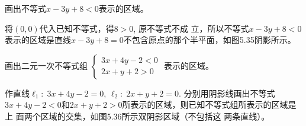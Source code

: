 \begin{example}
    画出不等式$x-3y+8<0$表示的区域。
\end{example}

\begin{solution}
将$(0,0)$代入已知不等式，得$8>0$, 原不等式不成
立，所以不等式$x-3y+8<0$表示的区域是直线$x-3y+8=
0$不包含原点的那个半平面，如图5.35阴影所示。
\end{solution}

\begin{example}
    画出二元一次不等式组
$\begin{cases}
      3x+4y-2<0\\
    2x+y+2>0  
\end{cases}$
    表示的区域。 
\end{example}


\begin{solution}
    作直线$\ell_1:\; 3x+4y-2=0$, $\ell_2:\; 2x+y+2=
0$. 分别用阴影线画出不等式$3x+4y-2<0$和$2x+y+
2>0$所表示的区域，则已知不等式组所表示的区域是上
面两个区域的交集，如图5.36所示双阴影区域（不包括这
两条直线）。
\end{solution}

\begin{figure}[htp]
    \centering
\begin{tikzpicture}


    
\end{tikzpicture} 
    \caption{}
\end{figure}


